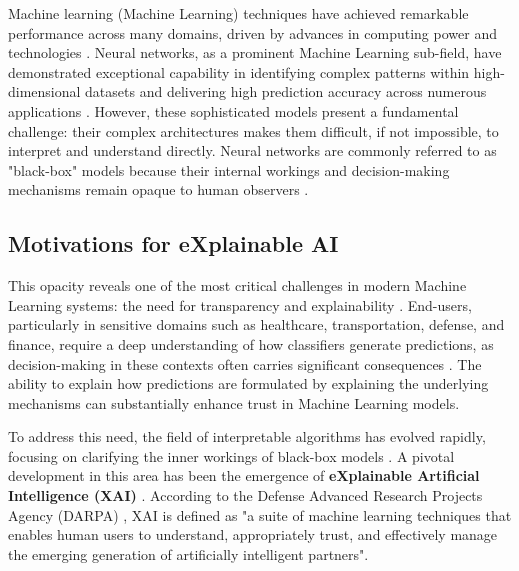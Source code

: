 Machine learning (Machine Learning) techniques have achieved remarkable performance across many domains, driven by advances in computing power and technologies \cite{alicioglu2021survey, 8022871, Chatzimparmpas_2020}. Neural networks, as a prominent Machine Learning sub-field, have demonstrated exceptional capability in identifying complex patterns within high-dimensional datasets and delivering high prediction accuracy across numerous applications \cite{alicioglu2021survey, AZODI2020442}. However, these sophisticated models present a fundamental challenge: their complex architectures makes them difficult, if not impossible, to interpret and understand directly. Neural networks are commonly referred to as "black-box" models because their internal workings and decision-making mechanisms remain opaque to human observers \cite{alicioglu2021survey}.

\subsection{Motivations for eXplainable AI}

This opacity reveals one of the most critical challenges in modern Machine Learning systems: the need for transparency and explainability \cite{alicioglu2021survey, Dağlarli20}. End-users, particularly in sensitive domains such as healthcare, transportation, defense, and finance, require a deep understanding of how classifiers generate predictions, as decision-making in these contexts often carries significant consequences \cite{alicioglu2021survey}. The ability to explain how predictions are formulated by explaining the underlying mechanisms can substantially enhance trust in Machine Learning models.

To address this need, the field of interpretable algorithms has evolved rapidly, focusing on clarifying the inner workings of black-box models \cite{alicioglu2021survey, 7536654}. A pivotal development in this area has been the emergence of \textbf{eXplainable Artificial Intelligence (XAI)} \cite{gunning2019darpa}. According to the Defense Advanced Research Projects Agency (DARPA) \cite{gunning2019darpa}, XAI is defined as "a suite of machine learning techniques that enables human users to understand, appropriately trust, and effectively manage the emerging generation of artificially intelligent partners".

